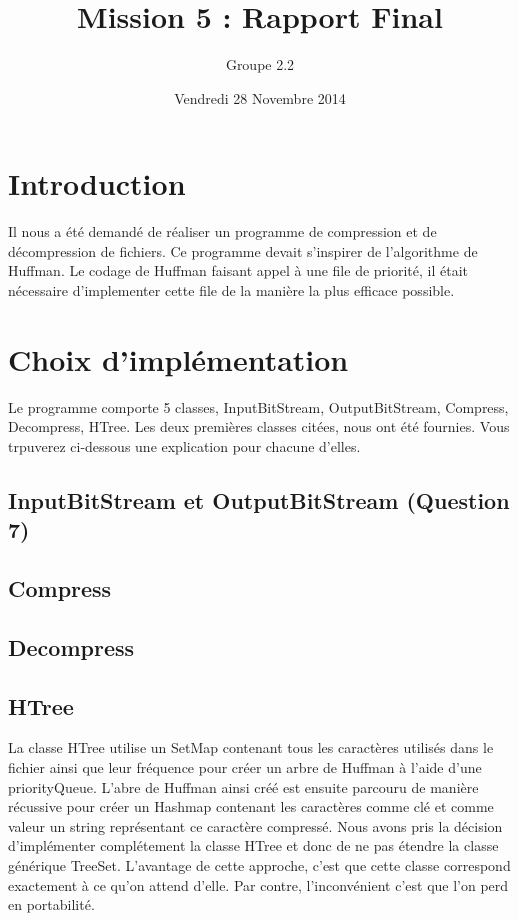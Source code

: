\documentclass[10pt,a4paper]{article}
\date{Vendredi 28 Novembre 2014}
\author{Groupe 2.2}
\title{Mission 5 : Rapport Final}
\begin{document}
\maketitle
\section*{Introduction}
Il nous a été demandé de réaliser un programme de compression et de décompression de fichiers. Ce programme devait s'inspirer de l'algorithme de Huffman. Le codage de Huffman faisant appel à une file de priorité, il était nécessaire d'implementer cette file de la manière la plus efficace possible.

\section*{Choix d'implémentation}
Le programme comporte 5 classes, InputBitStream, OutputBitStream, Compress, Decompress, HTree. Les deux premières classes citées, nous ont été fournies. Vous trpuverez ci-dessous une explication pour chacune d'elles.

\subsection*{InputBitStream et OutputBitStream (Question 7)}

\subsection*{Compress}


\subsection*{Decompress}


\subsection*{HTree}
La classe HTree utilise un SetMap contenant tous les caractères utilisés dans le fichier ainsi que leur fréquence pour créer un arbre de Huffman à l'aide d'une priorityQueue. L'abre de Huffman ainsi créé est ensuite parcouru de manière récussive pour créer un Hashmap contenant les caractères comme clé et comme valeur un string représentant ce caractère compressé.
Nous avons pris la décision d'implémenter complétement la classe HTree et donc de ne pas étendre la classe générique TreeSet. L'avantage de cette approche, c'est que cette classe correspond exactement à ce qu'on attend d'elle. Par contre, l'inconvénient c'est que l'on perd en portabilité.
\end{document}
